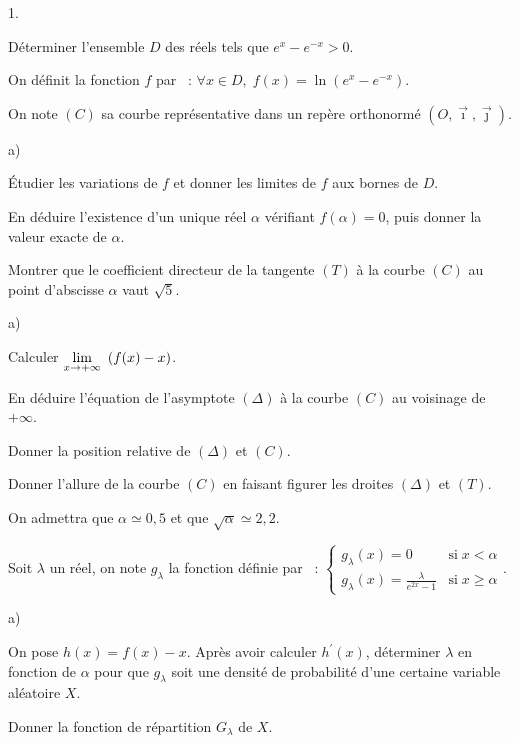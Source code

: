 \documentclass[11pt]{article}%
\begin{document}
\begin{noliste}{1.}
 \setlength{\itemsep}{4mm}
\item Déterminer l'ensemble $D$ des réels tels que $e^{x}-e^{-x}>0$.

On définit la fonction $f$ par~ : $\forall x \in D,\;
f(x) = \ln\left(e^{x}-e^{-x}\right)$.

On note $(C)$ sa courbe représentative dans un repère orthonormé
$(O,\vec{\imath},\vec{\jmath})$.

\item 
\begin{noliste}{a)}
 \setlength{\itemsep}{2mm}
\item Étudier les variations de $f$ et donner les limites de $f$ aux
bornes de $D$.

\item En déduire l'existence d'un unique réel $\alpha$ vérifiant
$f(\alpha) = 0$, puis donner la valeur exacte de $\alpha$.

\item Montrer que le coefficient directeur de la tangente $(T)$ à la
courbe $(C)$ au point d'abscisse $\alpha$ vaut $\sqrt{5}$.
\end{noliste}

\item 
\begin{noliste}{a)}
 \setlength{\itemsep}{2mm}
\item Calculer $ {\displaystyle \lim_{x\rightarrow + \infty} \ } \left(f(x)-x\right)
$.

\item En déduire l'équation de l'asymptote $(\Delta)$ à la courbe $(C)$
au voisinage de $ + \infty$.

\item Donner la position relative de $(\Delta)$ et $(C)$.
\end{noliste}

\item Donner l'allure de la courbe $(C)$ en faisant figurer les droites
$(\Delta)$ et $(T)$.

On admettra que $\alpha \simeq 0,5$ et que $\sqrt{\alpha}\simeq 2,2$.

\item Soit $\lambda$ un réel, on note $g_{\lambda}$ la fonction définie
par~ : $ \left\{
\begin{array}{ll}
g_{\lambda}(x) = 0 & \text{si} \; x<\alpha \\
g_{\lambda}(x) =  \frac{\lambda}{e^{2x}-1} & \text{si} \;
x\geq\alpha
\end{array}
\right.$.

\begin{noliste}{a)}
 \setlength{\itemsep}{2mm}
\item On pose $h(x) = f(x)-x$. Après avoir calculer $h^{\prime }(x)$,
déterminer $\lambda$ en fonction de $\alpha$ pour que $g_{\lambda}$
soit
une densité de probabilité d'une certaine variable aléatoire $X$.

\item Donner la fonction de répartition $G_{\lambda}$ de $X$.
\end{noliste}
\end{noliste}
\end{document}
